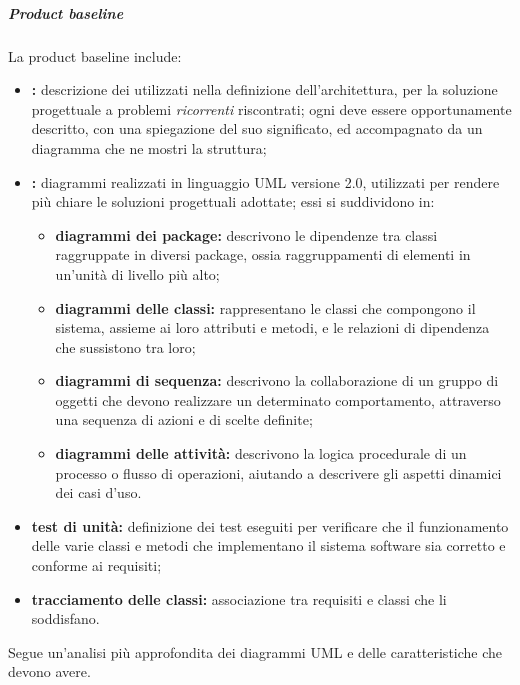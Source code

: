					\subparagraph{Product baseline}
						La product baseline include:
						\begin{itemize}
							\item \textbf{\glock{design pattern}:} descrizione dei  utilizzati nella definizione dell'architettura, per la soluzione progettuale a problemi \textit{ricorrenti} riscontrati; ogni  deve essere opportunamente descritto, con una spiegazione del suo significato, ed accompagnato da un diagramma che ne mostri la struttura;
							\item \textbf{:} diagrammi realizzati in linguaggio UML versione 2.0, utilizzati per rendere più chiare le soluzioni progettuali adottate; essi si suddividono in:
							\begin{itemize}
								\item \textbf{diagrammi dei package:} descrivono le dipendenze tra classi raggruppate in diversi package, ossia raggruppamenti di elementi in un'unità di livello più alto;
								\item \textbf{diagrammi delle classi:} rappresentano le classi che compongono il sistema, assieme ai loro attributi e metodi, e le relazioni di dipendenza che sussistono tra loro;			
								\item \textbf{diagrammi di sequenza:} descrivono la collaborazione di un gruppo di oggetti che devono realizzare un determinato comportamento, attraverso una sequenza di azioni e di scelte definite;
								\item \textbf{diagrammi delle attività:} descrivono la logica procedurale di un processo o flusso di operazioni, aiutando a descrivere gli aspetti dinamici dei casi d'uso.
							\end{itemize}
							\item \textbf{test di unità:} definizione dei test eseguiti per verificare che il funzionamento delle varie classi e metodi che implementano il sistema software sia corretto e conforme ai requisiti;
							\item \textbf{tracciamento delle classi:} associazione tra requisiti e classi che li soddisfano.
						\end{itemize}
					
						Segue un'analisi più approfondita dei diagrammi UML e delle caratteristiche che devono avere.

